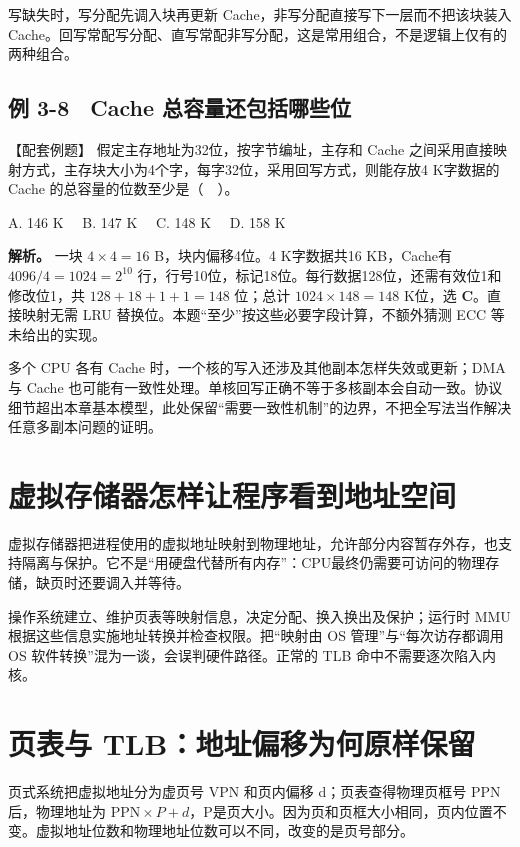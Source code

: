 写缺失时，写分配先调入块再更新 Cache，非写分配直接写下一层而不把该块装入 Cache。回写常配写分配、直写常配非写分配，这是常用组合，不是逻辑上仅有的两种组合。

\subsection{例 3-8　Cache 总容量还包括哪些位}\label{CO03-21}

\begin{example}[配套例题]

【配套例题】 假定主存地址为32位，按字节编址，主存和 Cache 之间采用直接映射方式，主存块大小为4个字，每字32位，采用回写方式，则能存放4 K字数据的 Cache 的总容量的位数至少是（　）。

A. 146 K　 B. 147 K　 C. 148 K　 D. 158 K

\end{example}

\textbf{解析。} 一块 \(4\times4=16\) B，块内偏移4位。4 K字数据共16 KB，Cache有 \(4096/4=1024=2^{10}\) 行，行号10位，标记18位。每行数据128位，还需有效位1和修改位1，共 \(128+18+1+1=148\) 位；总计 \(1024\times148=148\) K位，选 \textbf{C}。直接映射无需 LRU 替换位。本题``至少''按这些必要字段计算，不额外猜测 ECC 等未给出的实现。

多个 CPU 各有 Cache 时，一个核的写入还涉及其他副本怎样失效或更新；DMA 与 Cache 也可能有一致性处理。单核回写正确不等于多核副本会自动一致。协议细节超出本章基本模型，此处保留``需要一致性机制''的边界，不把全写法当作解决任意多副本问题的证明。

\section{虚拟存储器怎样让程序看到地址空间}\label{CO03-22}

虚拟存储器把进程使用的虚拟地址映射到物理地址，允许部分内容暂存外存，也支持隔离与保护。它不是``用硬盘代替所有内存''：CPU最终仍需要可访问的物理存储，缺页时还要调入并等待。

操作系统建立、维护页表等映射信息，决定分配、换入换出及保护；运行时 MMU 根据这些信息实施地址转换并检查权限。把``映射由 OS 管理''与``每次访存都调用 OS 软件转换''混为一谈，会误判硬件路径。正常的 TLB 命中不需要逐次陷入内核。

\section{页表与 TLB：地址偏移为何原样保留}\label{CO03-23}

页式系统把虚拟地址分为虚页号 VPN 和页内偏移 d；页表查得物理页框号 PPN 后，物理地址为 \(\mathrm{PPN}\times P+d\)，P是页大小。因为页和页框大小相同，页内位置不变。虚拟地址位数和物理地址位数可以不同，改变的是页号部分。


